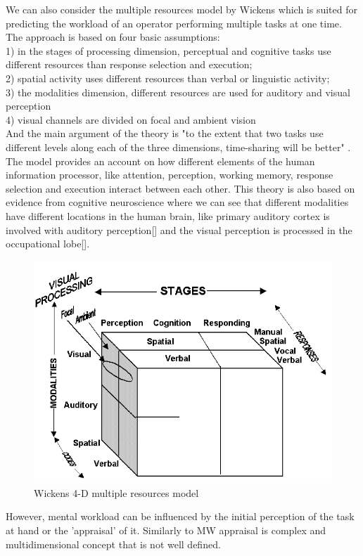 \documentclass[a4paper]{report}
\begin{document}
			We can also consider the multiple resources model by Wickens\cite{wickens2008multiple,wickens2002multiple} which is suited for predicting the workload of an operator performing multiple tasks at one time. The approach is based on four basic assumptions:\\

			1) in the stages of processing dimension, perceptual and cognitive tasks use different resources than response selection and execution;\\
			2) spatial activity uses different resources than verbal or linguistic activity;\\
			3) the modalities dimension, different resources are used for auditory and visual perception\\
			4) visual channels are divided on focal and ambient vision\\
			And the main argument of the theory is "to the extent that two tasks use different levels along each of the three dimensions, time-sharing will be better" \cite{wickens2008multiple}. The model provides an account on how different elements of the human information processor, like attention, perception, working memory, response selection and execution interact between each other. This theory is also based on evidence from cognitive neuroscience where we can see that different modalities have different locations in the human brain, like primary auditory cortex is involved with auditory perception[] and the visual perception is processed in the occupational lobe[].\\
							\begin{figure}[h]
								\centering
								\includegraphics[width=0.7\linewidth]{mrt}
								\caption[Multiple resource theory by Wickens]{Wickens 4-D multiple resources model}
								\label{fig:mrt}
							\end{figure}
			However, mental workload can be influenced by the initial perception of the task at hand or the 'appraisal' of it. Similarly to MW appraisal is complex and multidimensional concept\cite{folkman1986dynamics,peacock1990stress} that is not well defined.
		
\end{document}
